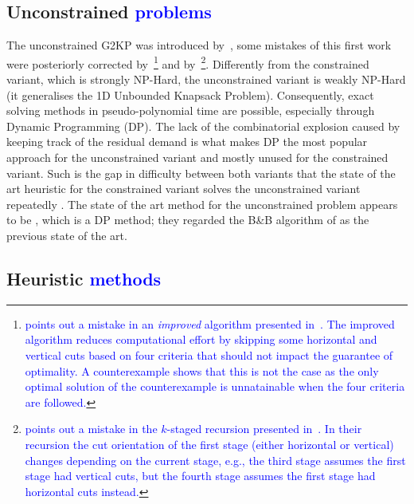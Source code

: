 \documentclass[ppgc,tese,english,formais,babel]{iiufrgs}
\newif\iffinalversion
\newcommand{\newtext}[1]{\iffinalversion%
#1%
\else%
\textcolor{blue}{#1}%
\fi%
}
\begin{document}
\subsection{Unconstrained \newtext{problems}}

The unconstrained G2KP was introduced by~\citet{gg:1965}, some mistakes of this first work were posteriorly corrected by~\citet{herz:1972}\footnote{\newtext{\citet{herz:1972} points out a mistake in an \emph{improved} algorithm presented in~\citet{gg:1965}. The improved algorithm reduces computational effort by skipping some horizontal and vertical cuts based on four criteria that should not impact the guarantee of optimality. A counterexample shows that this is not the case as the only optimal solution of the counterexample is unnatainable when the four criteria are followed.}}
and by~\citet{beasley:1985:guillotine}\footnote{\newtext{\citet{beasley:1985:guillotine} points out a mistake in the \(k\)-staged recursion presented in~\citet{gg:1965}. In their recursion the cut orientation of the first stage (either horizontal or vertical) changes depending on the current stage, e.g., the third stage assumes the first stage had vertical cuts, but the fourth stage assumes the first stage had horizontal cuts instead.}}.
Differently from the constrained variant, which is strongly NP-Hard, the unconstrained variant is weakly NP-Hard (it generalises the 1D Unbounded Knapsack Problem).
Consequently, exact solving methods in pseudo-polynomial time are possible, especially through Dynamic Programming (DP).
The lack of the combinatorial explosion caused by keeping track of the residual demand is what makes DP the most popular approach for the unconstrained variant and mostly unused for the constrained variant.
Such is the gap in difficulty between both variants that the state of the art heuristic for the constrained variant solves the unconstrained variant repeatedly \citep{velasco:2019}.
The state of the art method for the unconstrained problem appears to be \citet{russo:2014}, which is a DP method; they regarded the B\&B algorithm of \citet{kang:2011} as the previous state of the art.

\subsection{Heuristic \newtext{methods}}
\end{document}
